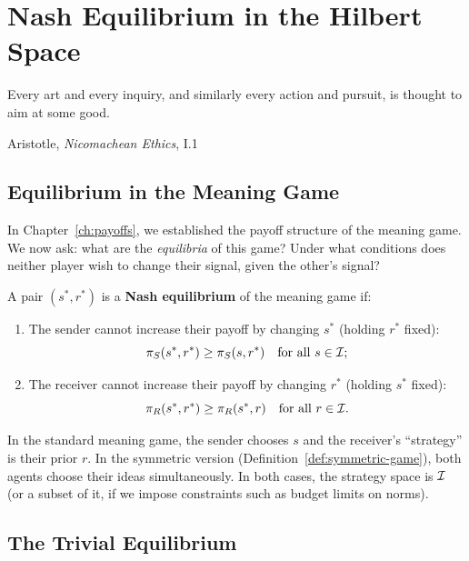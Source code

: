 \chapter{Nash Equilibrium in the Hilbert Space}
\label{ch:nash}

\epigraph{Every art and every inquiry, and similarly every action and pursuit,
is thought to aim at some good.}{Aristotle, \textit{Nicomachean Ethics}, I.1}

\section{Equilibrium in the Meaning Game}

In Chapter~\ref{ch:payoffs}, we established the payoff structure of the meaning
game. We now ask: what are the \emph{equilibria} of this game? Under what
conditions does neither player wish to change their signal, given the other's
signal?

\begin{definition}
\label{def:nash-meaning}
A pair $(s^*, r^*)$ is a \textbf{Nash equilibrium} of the meaning game if:
\begin{enumerate}
\item The sender cannot increase their payoff by changing $s^*$ (holding $r^*$
fixed):
\[
  \pi_{S}(s^*, r^*) \geq \pi_{S}(s, r^*) \quad \text{for all } s \in \mathcal{I};
\]
\item The receiver cannot increase their payoff by changing $r^*$ (holding $s^*$
fixed):
\[
  \pi_{R}(s^*, r^*) \geq \pi_{R}(s^*, r) \quad \text{for all } r \in \mathcal{I}.
\]
\end{enumerate}
\end{definition}

\begin{remark}
In the standard meaning game, the sender chooses $s$ and the receiver's
``strategy'' is their prior $r$. In the symmetric version
(Definition~\ref{def:symmetric-game}), both agents choose their ideas
simultaneously. In both cases, the strategy space is $\mathcal{I}$ (or a subset of it,
if we impose constraints such as budget limits on norms).
\end{remark}


\section{The Trivial Equilibrium}

